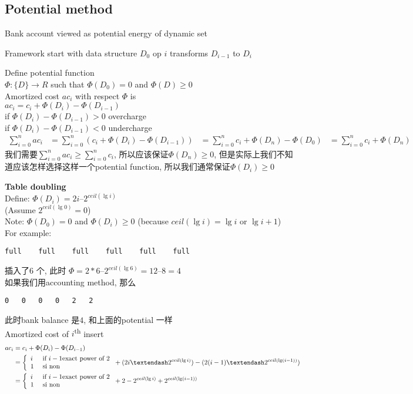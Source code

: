 \documentclass{article}
\begin{document}
\subsection{Potential method}
Bank account viewed as potential energy of dynamic set

Framework
start with data structure $D_0$
op $i$ transforms $D_{i-1}$ to $D_{i}$

Define potential function\\
$\Phi: \{D\} \rightarrow R$ such that $\Phi(D_0) = 0$ and $\Phi(D) \geq 0$\\
Amortized cost $ac_i$ with respect $\Phi$ is\\
$ac_i = c_i + \Phi(D_i) - \Phi(D_{i-1})$\\
if $\Phi(D_i) - \Phi(D_{i-1})>0$ overcharge\\
if $\Phi(D_i) - \Phi(D_{i-1})<0$ undercharge
$$
\begin{aligned}
\sum_{i=0}^n ac_i
&= \sum_{i=0}^n (c_i + \Phi(D_i) - \Phi(D_{i-1}))
&= \sum_{i=0}^n c_i + \Phi(D_n) - \Phi(D_0)
&= \sum_{i=0}^n c_i + \Phi(D_n)
\end{aligned}
$$
我们需要$\sum_{i=0}^n ac_i \geq \sum_{i=0}^n c_i$, 所以应该保证$\Phi(D_n)\geq 0$, 但是实际上我们不知道应该怎样选择这样一个potential function, 所以我们通常保证$\Phi(D_i) \geq 0$

\textbf{Table doubling}\\
Define: $\Phi(D_i) = 2i – 2^{ceil(\lg i)}$\\
(Assume $2^{ceil(\lg 0)} = 0$)\\
Note: $\Phi(D_0) = 0$ and $\Phi(D_i) \geq 0$ (because $ceil(\lg i) = \lg i$ or $\lg i + 1$)\\
For example:
\begin{verbatim}
full	full	full	full	full	full		
\end{verbatim}
插入了$6$ 个, 此时 $\Phi = 2*6 – 2^{ceil(\lg 6)} = 12 – 8 =4$\\
如果我们用accounting method, 那么
\begin{verbatim}
0	0	0	0	2	2		
\end{verbatim}
此时bank balance 是$4$, 和上面的potential 一样\\
Amortized cost of $i$\textsuperscript{th} insert
$$
\begin{aligned}
ac_i
&= c_i +\Phi(D_i) - \Phi(D_{i-1})\\
&=
\left\{
  \begin{array}{ll}
		  i & \si i-1 \mbox{exact power of } 2\\
		  1 & \sinon
  \end{array}
\right.
+ (2i – 2^{ceil(\lg i)}) - (2(i-1) – 2^{ceil(\lg (i-1))})\\
&=
\left\{
  \begin{array}{ll}
		  i & \si i-1 \mbox{exact power of } 2\\
		  1 & \sinon
  \end{array}
\right.
+ 2 - 2^{ceil(\lg i)} + 2^{ceil(\lg (i-1))}
\end{aligned}
$$
\end{document}
